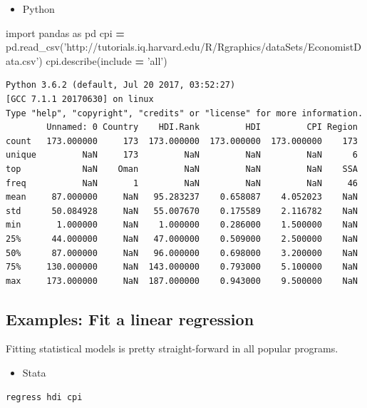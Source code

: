 \documentclass[]{book}
\newenvironment{Shaded}{\begin{snugshade}}{\end{snugshade}}
\newcommand{\StringTok}[1]{\textcolor[rgb]{0.31,0.60,0.02}{#1}}
\newcommand{\ImportTok}[1]{#1}
\newcommand{\OperatorTok}[1]{\textcolor[rgb]{0.81,0.36,0.00}{\textbf{#1}}}
\newcommand{\NormalTok}[1]{#1}
\providecommand{\tightlist}{%
  \setlength{\itemsep}{0pt}\setlength{\parskip}{0pt}}
\begin{document}
\begin{itemize}
\tightlist
\item
  Python
\end{itemize}

\begin{Shaded}
\begin{Highlighting}[]
\ImportTok{import}\NormalTok{ pandas }\ImportTok{as}\NormalTok{ pd}
\NormalTok{cpi }\OperatorTok{=}\NormalTok{ pd.read_csv(}\StringTok{'http://tutorials.iq.harvard.edu/R/Rgraphics/dataSets/EconomistData.csv'}\NormalTok{)}
\NormalTok{cpi.describe(include }\OperatorTok{=} \StringTok{'all'}\NormalTok{)}
\end{Highlighting}
\end{Shaded}

\begin{verbatim}
Python 3.6.2 (default, Jul 20 2017, 03:52:27) 
[GCC 7.1.1 20170630] on linux
Type "help", "copyright", "credits" or "license" for more information.
        Unnamed: 0 Country    HDI.Rank         HDI         CPI Region
count   173.000000     173  173.000000  173.000000  173.000000    173
unique         NaN     173         NaN         NaN         NaN      6
top            NaN    Oman         NaN         NaN         NaN    SSA
freq           NaN       1         NaN         NaN         NaN     46
mean     87.000000     NaN   95.283237    0.658087    4.052023    NaN
std      50.084928     NaN   55.007670    0.175589    2.116782    NaN
min       1.000000     NaN    1.000000    0.286000    1.500000    NaN
25%      44.000000     NaN   47.000000    0.509000    2.500000    NaN
50%      87.000000     NaN   96.000000    0.698000    3.200000    NaN
75%     130.000000     NaN  143.000000    0.793000    5.100000    NaN
max     173.000000     NaN  187.000000    0.943000    9.500000    NaN
\end{verbatim}

\subsection{Examples: Fit a linear
regression}\label{examples-fit-a-linear-regression}

Fitting statistical models is pretty straight-forward in all popular
programs.

\begin{itemize}
\tightlist
\item
  Stata
\end{itemize}

\begin{verbatim}
regress hdi cpi
\end{verbatim}
\end{document}

